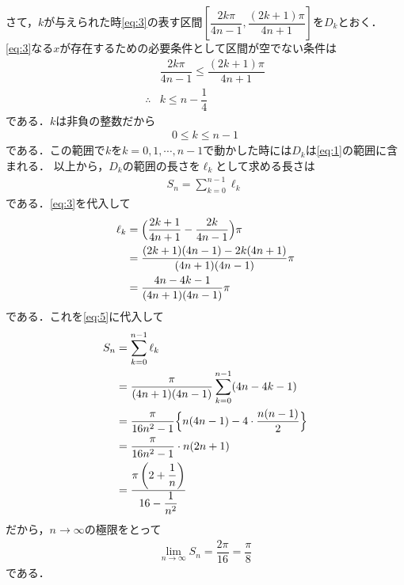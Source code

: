 \documentclass[../../main.tex]{subfiles}
\begin{document}
さて，$k$が与えられた時\cref{eq:3}の表す区間$\left[\dfrac{2k\pi}{4n-1},\dfrac{(2k+1)\pi}{4n+1}\right]$を$D_k$とおく．\cref{eq:3}なる$x$が存在するための必要条件として区間が空でない条件は
\begin{align}
  & \dfrac{2k\pi}{4n-1}\le\dfrac{(2k+1)\pi}{4n+1} \\
  \therefore
  & k\le n-\dfrac{1}{4}
\end{align}
である．$k$は非負の整数だから
\begin{align}
  0 \le k \le n-1 \label{eq:4}
\end{align}
である．この範囲で$k$を$k=0,1,\cdots, n-1$で動かした時には$D_k$は\cref{eq:1}の範囲に含まれる．
以上から，$D_k$の範囲の長さを$\ell_k$として求める長さは
\begin{align}
  S_n=\sum_{k=0}^{n-1}\ell_k \label{eq:5}
\end{align}
である．\cref{eq:3}を代入して
\begin{align}
  \ell_k
  &=\Bigl(\dfrac{2k+1}{4n+1}-\dfrac{2k}{4n-1}\Bigr)\pi \\
  &=\dfrac{(2k+1)(4n-1)-2k(4n+1)}{(4n+1)(4n-1)}\pi \\
  &=\dfrac{4n-4k-1}{(4n+1)(4n-1)}\pi
\end{align}
である．これを\cref{eq:5}に代入して
\begin{align}
  S_n
  &=\sum_{k=0}^{n-1}\ell_k \\
  &=\dfrac{\pi}{(4n+1)(4n-1)}\sum_{k=0}^{n-1}(4n-4k-1) \\
  &=\dfrac{\pi}{16n^2-1}\Bigl\{n(4n-1)-4\cdot\dfrac{n(n-1)}{2}\Bigr\} \\
  &=\dfrac{\pi}{16n^2-1}\cdot n(2n+1) \\
  &=\dfrac{\pi\left(2+\dfrac{1}{n}\right)}{16-\dfrac{1}{n^2}}
\end{align}
だから，$n\to\infty$の極限をとって
\begin{align}
  \lim_{n\to\infty}S_n= \dfrac{2\pi}{16} = \dfrac{\pi}{8}
\end{align}
である．

\newpage
\end{document}
